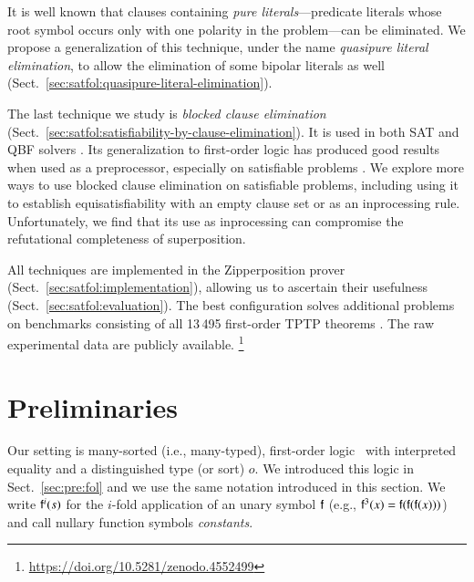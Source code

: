 \begin{qle}
It is well known that clauses containing \emph{pure literals}---predicate
literals whose root symbol occurs only with one polarity in the problem---can
be eliminated. We propose a generalization of this technique, under the name
\emph{quasipure literal elimination}, to allow the elimination of some bipolar
literals as well (Sect.~\ref{sec:satfol:quasipure-literal-elimination}).
\end{qle}

The last technique we study is \emph{blocked clause elimination} (Sect.\
\ref{sec:satfol:satisfiability-by-clause-elimination}). It is used in both SAT
\cite{jbh-10-BCE} and QBF solvers \cite{bls-11-bloqqer}. Its generalization to first-order
logic has produced good results when used as a preprocessor, especially on
satisfiable problems \cite{ksstb-2017-blockedfol}. We explore more ways to use
blocked clause elimination on satisfiable problems, including using it to
establish equisatisfiability with an empty clause set or as an inprocessing
rule. Unfortunately, we find that its use as inprocessing can compromise the
refutational completeness of superposition.


All techniques are implemented in the Zipperposition prover
(Sect.~\ref{sec:satfol:implementation}), allowing us to ascertain their usefulness
(Sect.~\ref{sec:satfol:evaluation}). The best configuration solves \NumberOK{160}
additional problems on benchmarks consisting of all 13\,495 first-order TPTP theorems
\cite{gs-17-tptp}. The raw experimental data are publicly available.%
\footnote{\url{https://doi.org/10.5281/zenodo.4552499}}

\section{Preliminaries}
\label{sec:satfol:preliminaries}

Our setting is many-sorted (i.e., many-typed), first-order
logic~\cite{jg-1987-logic-textbook} with interpreted equality and a
distinguished type (or sort) $o$. We introduced this logic in
Sect.~\ref{sec:pre:fol} and we use the same notation introduced in this section.
We write $\mathsf{f}^i(s)$ for the $i$-fold application of an unary symbol
$\mathsf{f}$ (e.g., $\mathsf{f}^3(x) = \mathsf{f}(\mathsf{f}(\mathsf{f}(x)))$) and call nullary
function symbols \emph{constants}. 

